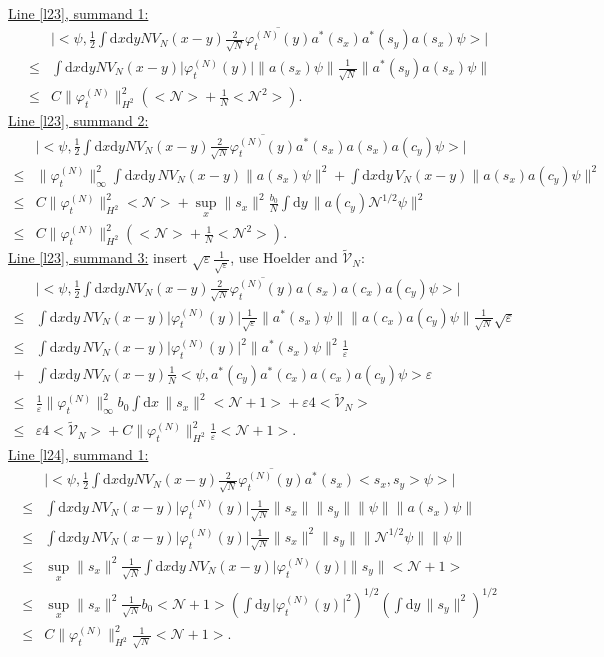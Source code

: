 \documentclass[11pt,a4paper]{scrartcl}
\newcommand{\di}{\textrm{d}}		%
\newcommand{\Ncal}{\mathcal{N}}		%
\newcommand{\tilV}{\tilde{\mathcal{V}}_N}		%
\newcommand{\estlist}[2]{\underline{Line \ref{l#1}, summand #2:}}
\newcommand{\scal}[2]{\big<#1,#2\big>} %
\newcommand{\cc}[1]{\overline{#1}}	%
\newcommand{\norm}[1]{\lVert#1\rVert}	%
\newcommand{\ev}[1]{\big<#1\big>}	%
\newcommand{\ph}{\varphi_t^{(N)}}	%
\newcommand{\dxyNV}{\frac{1}{2}\int \di x\di y N V_N(x-y)} %
\begin{document}
\estlist{23}{1}
\begin{align*}
& \lvert \scal{\psi}{\dxyNV \frac{2}{\sqrt{N}}\cc{\ph(y)} a^\ast(s_x) a^\ast(s_y)a(s_x)\psi} \rvert \\
\leq & \int \di x\di y NV_N(x-y) \lvert \ph(y)\rvert \norm{a(s_x)\psi} \frac{1}{\sqrt{N}}\norm{a^\ast(s_y)a(s_x)\psi} \\
\leq & C \norm{\ph}_{H^2}^2 \left( \ev{\Ncal} + \frac{1}{N}\ev{\Ncal^2} \right).
\end{align*}
\estlist{23}{2}
\begin{align*}
 & \lvert \scal{\psi}{\dxyNV \frac{2}{\sqrt{N}} \cc{\ph(y)} a^\ast(s_x) a(s_x) a(c_y) \psi}\rvert \\
\leq & \norm{\ph}_\infty^2 \int \di x\di y\, NV_N(x-y) \norm{a(s_x)\psi}^2 + \int \di x \di y\, V_N(x-y) \norm{a(s_x)a(c_y)\psi}^2 \\
\leq & C \norm{\ph}_{H^2}^2 \ev{\Ncal} + \sup_x \norm{s_x}^2 \frac{b_0}{N} \int \di y\, \norm{a(c_y)\Ncal^{1/2}\psi}^2\\
\leq & C \norm{\ph}_{H^2}^2 \left( \ev{\Ncal} + \frac{1}{N}\ev{\Ncal^2} \right). 
\end{align*}
\estlist{23}{3} insert $\sqrt{\varepsilon} \frac{1}{\sqrt{\varepsilon}}$, use Hoelder and $\tilV$:
\begin{align*}
& \lvert \scal{\psi}{\dxyNV \frac{2}{\sqrt{N}} \cc{\ph(y)} a(s_x) a(c_x) a(c_y)\psi} \rvert \\
\leq & \int \di x\di y\, NV_N(x-y) \lvert \ph(y)\rvert \frac{1}{\sqrt{\varepsilon}} \norm{a^\ast(s_x)\psi} \norm{a(c_x)a(c_y)\psi}\frac{1}{\sqrt{N}}\sqrt{\varepsilon} \\
\leq & \int \di x\di y\, NV_N(x-y) \lvert \ph(y)\rvert^2
  \norm{a^\ast(s_x)\psi}^2\frac{1}{\varepsilon} \\
  + & \int \di x\di y\, NV_N(x-y) \frac{1}{N} \scal{\psi}{a^\ast(c_y)a^\ast(c_x)a(c_x)a(c_y)\psi}\varepsilon \\
\leq & \frac{1}{\varepsilon} \norm{\ph}_\infty^2 b_0 \int \di x\, \norm{s_x}^2 \ev{\Ncal+1} + \varepsilon 4 \ev{\tilV}\\
\leq & \varepsilon 4 \ev{\tilV} + C\norm{\ph}_{H^2}^2 \frac{1}{\varepsilon}\ev{\Ncal+1}.
\end{align*}
\estlist{24}{1}
\begin{align*}
 & \lvert \scal{\psi}{\dxyNV \frac{2}{\sqrt{N}}\cc{\ph(y)}a^\ast(s_x)\scal{s_x}{s_y}\psi} \rvert \\
\leq & \int \di x\di y\, NV_N(x-y) \lvert \ph(y)\rvert \frac{1}{\sqrt{N}} \norm{s_x} \norm{s_y} \norm{\psi} \norm{a(s_x)\psi} \\
\leq & \int \di x\di y\, NV_N(x-y) \lvert \ph(y)\rvert \frac{1}{\sqrt{N}} \norm{s_x}^2 \norm{s_y} \norm{\Ncal^{1/2}\psi} \norm{\psi} \\
\leq & \sup_x \norm{s_x}^2 \frac{1}{\sqrt{N}} \int \di x\di y\, NV_N(x-y) \lvert \ph(y)\rvert \norm{s_y} \ev{\Ncal+1} \\
\leq & \sup_x \norm{s_x}^2 \frac{1}{\sqrt{N}} b_0 \ev{\Ncal+1} \left( \int \di y\, \lvert \ph(y)\rvert^2 \right)^{1/2} \left( \int \di y\, \norm{s_y}^2 \right)^{1/2} \\
\leq & C\norm{\ph}_{H^2}^2 \frac{1}{\sqrt{N}}\ev{\Ncal+1}.
\end{align*}
\end{document}

